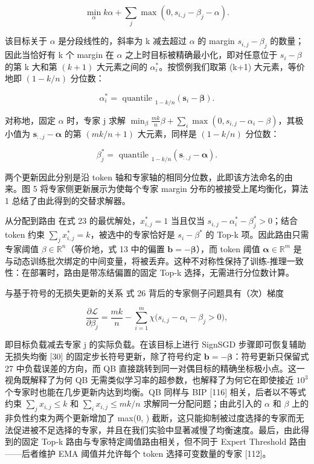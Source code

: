 \[
\min _ {\alpha} k \alpha + \sum_ {j} \max \left(0, s _ {i, j} - \beta_ {j} - \alpha\right).\tag{24}
\]

该目标关于 \(\alpha\) 是分段线性的，斜率为 k 减去超过 \(\alpha\) 的 margin \(s _ { i , j } - \beta _ { j }\) 的数量；因此当恰好有 k 个 margin 在 \(\alpha\) 之上时目标被精确最小化，即对任意位于 \(s _ { i } - \beta\) 的第 k 大和第 \((k+1)\) 大元素之间的 \(\alpha _ { i } ^ { * }\)。按惯例我们取第 (k+1) 大元素，等价地即 \(( 1 - k / n )\) 分位数：

\[
\alpha_ {i} ^ {*} = \text { quantile } _ {1 - k / n} (\boldsymbol {s} _ {i} - \boldsymbol {\beta}).\tag{25}
\]

对称地，固定 \(\alpha\) 时，专家 j 求解 \(\min_{\beta} \frac { m k } { n } \beta + \sum _ { i } \max ( 0 , s _ { i , j } - \alpha _ { i } - \beta )\)，其极小值为 \(\mathbf { s } _ { : , j } - \boldsymbol { \alpha }\) 的第 \((mk/n+1)\) 大元素，同样是 \(( 1 - k / n )\) 分位数：

\[
\beta_ {j} ^ {*} = \text { quantile } _ {1 - k / n} \left(\boldsymbol {s} _ {:, j} - \boldsymbol {\alpha}\right).\tag{26}
\]

两个更新因此分别是沿 token 轴和专家轴的相同分位数，此即该方法命名的由来。图 5 将专家侧更新展示为使每个专家 margin 分布的被接受上尾均衡化，算法 1 总结了由此得到的交替求解器。

从分配到路由 在式 23 的最优解处，\(x _ { i , j } ^ { * } = 1\) 当且仅当 \(s _ { i , j } - \alpha _ { i } ^ { * } - \beta _ { j } ^ { * } > 0\)；结合 token 约束 \(\textstyle \sum _ { j } x _ { i , j } ^ { * } = k\)，被选中的专家恰好是 \(s _ { i } - \beta ^ { * }\) 的 Top-k 项。因此路由只需专家阈值 \(\beta \in \mathbb { R } ^ { n }\)（等价地，式 13 中的偏置 \(\boldsymbol { b } = - \boldsymbol { \beta }\)），而 token 阈值 \(\pmb { \alpha } \in \mathbb { R } ^ { m }\) 是与动态训练批次绑定的中间变量，将被丢弃。这种不对称性保持了训练-推理一致性：在部署时，路由是带冻结偏置的固定 Top-k 选择，无需进行分位数计算。

与基于符号的无损失更新的关系 式 26 背后的专家侧子问题具有（次）梯度

\[
\frac {\partial \mathcal {L}}{\partial \beta_ {j}} = \frac {m k}{n} - \sum_ {i = 1} ^ {m} \chi \big (s _ {i, j} - \alpha_ {i} - \beta_ {j} > 0 \big),\tag{27}
\]

即目标负载减去专家 j 的实际负载。在该目标上进行 SignSGD 步骤即可恢复辅助无损失均衡 {[}30{]} 的固定步长符号更新，除了符号约定 \(\boldsymbol { b } = - \boldsymbol { \beta }\)：符号更新只保留式 27 中负载误差的方向，而 QB 直接跳转到同一对偶目标的精确坐标极小点。这一视角既解释了为何 QB 无需类似学习率的超参数，也解释了为何它在即使接近 \(10^3\) 个专家时也能在几步更新内达到均衡。QB 同样与 BIP {[}116{]} 相关，后者以不等式约束 \(\textstyle \sum _ { j } x _ { i , j } \leq k\) 和 \(\textstyle \sum _ { i } x _ { i , j } \leq m k / n\) 求解同一分配问题；由此引入的 \(\alpha\) 和 \(\beta\) 上的非负性约束为两个更新增加了 max(0, ) 截断，这只能抑制被过度选择的专家而无法促进被不足选择的专家，并且在我们实验中显著减慢了均衡速度。最后，由此得到的固定 Top-k 路由与专家特定阈值路由相关，但不同于 Expert Threshold 路由——后者维护 EMA 阈值并允许每个 token 选择可变数量的专家 {[}112{]}。

